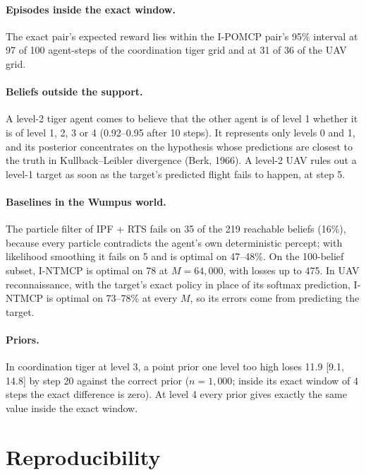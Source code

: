 \documentclass{article}
\begin{document}
\paragraph{Episodes inside the exact window.} The exact pair's expected reward lies within the I-POMCP pair's 95\% interval at 97 of 100 agent-steps of the coordination tiger grid and at 31 of 36 of the UAV grid.

\paragraph{Beliefs outside the support.} A level-2 tiger agent comes to believe that the other agent is of level 1 whether it is of level 1, 2, 3 or 4 (0.92--0.95 after 10 steps). It represents only levels 0 and 1, and its posterior concentrates on the hypothesis whose predictions are closest to the truth in Kullback--Leibler divergence (Berk, 1966). A level-2 UAV rules out a level-1 target as soon as the target's predicted flight fails to happen, at step 5.

\paragraph{Baselines in the Wumpus world.} The particle filter of IPF + RTS fails on 35 of the 219 reachable beliefs (16\%), because every particle contradicts the agent's own deterministic percept; with likelihood smoothing it fails on 5 and is optimal on 47--48\%. On the 100-belief subset, I-NTMCP is optimal on 78 at $M = 64{,}000$, with losses up to 475. In UAV reconnaissance, with the target's exact policy in place of its softmax prediction, I-NTMCP is optimal on 73--78\% at every $M$, so its errors come from predicting the target.

\paragraph{Priors.} In coordination tiger at level 3, a point prior one level too high loses 11.9 [9.1, 14.8] by step 20 against the correct prior ($n = 1{,}000$; inside its exact window of 4 steps the exact difference is zero). At level 4 every prior gives exactly the same value inside the exact window.

\section{Reproducibility}
\end{document}
